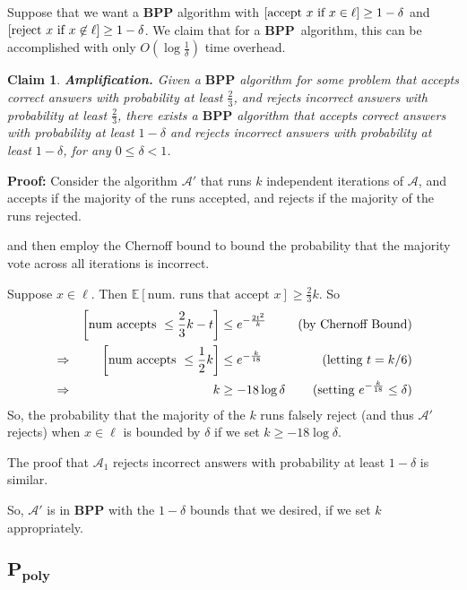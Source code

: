 \documentclass[11pt]{article}
\let\Pr\relax
\DeclareMathOperator*{\Pr}{\mathbb{P}}
\newcommand{\BPP}{\ensuremath{\mathbf{BPP}}}
\newcommand{\Ppoly}{\ensuremath{\mathbf{P_{poly}}}}
\newcommand{\Alg}{\ensuremath{\mathcal{A}}}
\newtheorem{claim}[theorem]{Claim}
\begin{document}
Suppose that we want a $\BPP$ algorithm with $\Pr[\text{accept $x$ if $x\in\ell$}] \ge 1-\delta$ and $\Pr[\text{reject $x$ if $x\not\in\ell$}] \ge 1 - \delta$. We claim that for a \BPP\ algorithm, this can be accomplished with only $O(\log{\frac{1}{\delta}})$ time overhead.

\begin{claim}\label{amplification}
\textbf{Amplification.} Given a $\BPP$ algorithm for some problem that accepts correct answers with probability at least $\frac23$, and rejects incorrect answers with probability at least $\frac23$, there exists a $\BPP$ algorithm that accepts correct answers with probability at least $1 - \delta$ and rejects incorrect answers with probability at least $1 - \delta$, for any $0 \le \delta < 1$.

\end{claim}
\textbf{Proof:} Consider the algorithm $\Alg'$ that runs $k$ independent iterations of $\Alg$, and accepts if the majority of the runs accepted, and rejects if the majority of the runs rejected.

and then employ the Chernoff bound to bound the probability that the majority vote across all iterations is incorrect.

Suppose $x\in\ell$. Then $\mathbb{E}[\text{num. runs that accept } x] \geq \frac{2}{3}k$.
So
\begin{align*}
  &&\Pr\left[\text{num accepts }\leq \frac{2}{3}k - t\right] &\leq e^{-{\frac{2t^2}{k}}} &\text{(by Chernoff Bound)} \\
  &\Rightarrow&
  \Pr\left[\text{num accepts }\leq \frac12k\right] &\leq e^{-{\frac{k}{18}}} &\text{(letting $t = k/6$)} \\
  &\Rightarrow &
  k &\ge -18\log \delta &\text{(setting $e^{-\frac{k}{18}} \le \delta$)}
\end{align*}
So, the probability that the majority of the $k$ runs falsely reject (and thus $\Alg'$ rejects) when $x \in \ell$ is bounded by $\delta$ if we set $k \ge -18 \log \delta$.

The proof that $\Alg_1$ rejects incorrect answers with probability at least $1 - \delta$ is similar.

So, $\Alg'$ is in $\BPP$ with the $1 - \delta$ bounds that we desired, if we set $k$ appropriately.

\subsection{\Ppoly}
\end{document}
